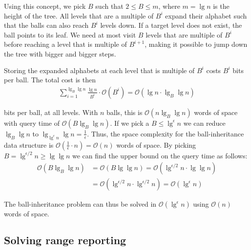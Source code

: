 Using this concept, we pick $B$ such that $2 \leq B \leq m$, where $m = \lg n$ is the height of the tree. All levels that are a multiple of $B^i$ expand their alphabet such that the balls can also reach $B^i$ levels down. If a target level does not exist, the ball points to its leaf. We need at most visit $B$ levels that are multiple of $B^i$ before reaching a level that is multiple of $B^{i+1}$, making it possible to jump down the tree with bigger and bigger steps.

Storing the expanded alphabets at each level that is multiple of $B^i$ costs $B^i$ bits per ball. The total cost is then 
\begin{align*}
  \sum\limits_{i=1}^{\lg_B \lg n} \frac{\lg n}{B^i} \cdot \mathcal{O}(B^i) = \mathcal{O}(\lg n \cdot \lg_B \lg n)
\end{align*}


\noindent bits per ball, at all levels. With $n$ balls, this is $\mathcal{O}(n \lg_B \lg n)$ words of space with query time of $\mathcal{O}(B \lg_B \lg n)$. If we pick a $B \leq \lg^\epsilon n$ we can reduce $\lg_B \lg n$ to $\lg_{\lg^\epsilon n} \lg n = \frac{1}{\epsilon}$. Thus, the space complexity for the ball-inheritance data structure is $\mathcal{O}(\frac{1}{\epsilon} \cdot n) = \mathcal{O}(n)$ words of space. By picking $B = \lg^{\epsilon / 2} n \geq \lg \lg n$ we can find the upper bound on  the query time as follows:
\begin{align*}
  \mathcal{O}(B \lg_B \lg n) &= \mathcal{O}(B \lg \lg n) = \mathcal{O}(\lg^{\epsilon /2} n \cdot \lg \lg n)\\
  &= \mathcal{O}(\lg^{\epsilon / 2} n \cdot \lg^{\epsilon / 2} n) = \mathcal{O}(\lg^\epsilon n)
\end{align*}

\noindent The ball-inheritance problem can thus be solved in $\mathcal{O}(\lg^\epsilon n)$ using $\mathcal{O}(n)$ words of space.

\subsection{Solving range reporting}

